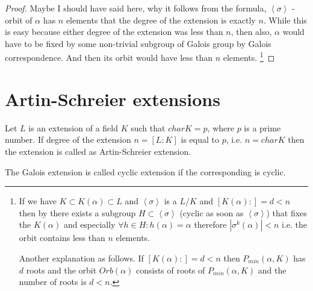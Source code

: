 \begin{proposition}
\begin{proof}
    Maybe I should have said here, why it follows from the formula,
    $\left<\sigma\right>$ - orbit of $\alpha$ has $n$ elements
    that the degree of the extension is exactly $n$. While this is
    easy because either degree of the extension was less than $n$,
    then also, $\alpha$ would have to be fixed by some non-trivial
    subgroup of Galois group by Galois correspondence. And then its
    orbit would have less than $n$ elements.
    \footnote{
      If we have $K \subset K\left(\alpha\right) \subset L$ and
      $\left<\sigma\right>$ is a  $L/K$ and
      $\left[K\left(\alpha\right):\right] = d < n$ then by
       there exists a subgroup
      $H \subset \left<\sigma\right>$
      (cyclic as soon as  $\left<\sigma\right>$) that fixes the
      $K\left(\alpha\right)$ and especially $\forall h \in H:
      h\left(\alpha\right) = \alpha$
      therefore
      $\left|\sigma^k\left(\alpha\right)\right| < n$ i.e. the orbit
      contains less than $n$ elements.

      Another explanation as follows. If
      $\left[K\left(\alpha\right):\right] = d < n$ then
      $P_{min}\left(\alpha, K\right)$ has $d$ roots and the orbit
      $Orb\left(\alpha\right)$ consists of roots of
      $P_{min}\left(\alpha, K\right)$ and the number of roots is
      $d < n$.
    }
  \end{proof}
  \label{prop:lec7_2}
\end{proposition}
  
\section{Artin-Schreier extensions}

\begin{definition}
  Let $L$ is an extension of a field $K$ such that $char K = p$, where $p$
  is a prime number. If degree of the extension $n=\left[L:K\right]$
  is equal to $p$, i.e. $n = char K$ then the extension is called  as
  Artin-Schreier extension. 
  \label{def:srtinschreierextension}
\end{definition}

\begin{definition}
  The Galois extension is called cyclic extension if the corresponding
   is cyclic.
  \label{def:cyclicextension}
\end{definition}

